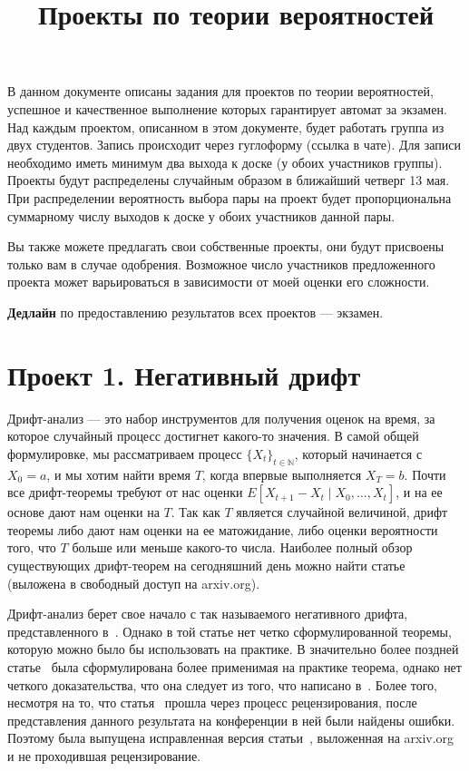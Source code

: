 \documentclass[12pt]{article}
\title{Проекты по теории вероятностей}
\newcommand\N{\mathbb{N}}
\begin{document}
\maketitle

В данном документе описаны задания для проектов по теории вероятностей, успешное и качественное выполнение которых гарантирует автомат за экзамен. Над каждым проектом, описанном в этом документе, будет работать группа из двух студентов. Запись происходит через гуглоформу (ссылка в чате). Для записи необходимо иметь минимум два выхода к доске (у обоих участников группы). Проекты будут распределены случайным образом в ближайший четверг 13 мая. При распределении вероятность выбора пары на проект будет пропорциональна суммарному числу выходов к доске у обоих участников данной пары.

Вы также можете предлагать свои собственные проекты, они будут присвоены только вам в случае одобрения. Возможное число участников предложенного проекта может варьироваться в зависимости от моей оценки его сложности.

\textbf{Дедлайн} по предоставлению результатов всех проектов --- экзамен.

\section*{Проект 1. Негативный дрифт}

Дрифт-анализ --- это набор инструментов для получения оценок на время, за которое случайный процесс достигнет какого-то значения. В самой общей формулировке, мы рассматриваем процесс $\{X_t\}_{t \in \N}$, который начинается с $X_0 = a$, и мы хотим найти время $T$, когда впервые выполняется $X_T = b$. Почти все дрифт-теоремы требуют от нас оценки $E[X_{t + 1} - X_{t} \mid X_0, \dots, X_t]$, и на ее основе дают нам оценки на $T$. Так как $T$ является случайной величиной, дрифт теоремы либо дают нам оценки на ее матожидание, либо оценки вероятности того, что $T$ больше или меньше какого-то числа. Наиболее полный обзор существующих дрифт-теорем на сегодняшний день можно найти статье~\cite{Lengler17} (выложена в свободный доступ на arxiv.org).

Дрифт-анализ берет свое начало с так называемого негативного дрифта, представленного в~\cite{Hajek82}. Однако в той статье нет четко сформулированной теоремы, которую можно было бы использовать на практике. В значительно более поздней статье~\cite{OlivetoW11} была сформулирована более применимая на практике теорема, однако нет четкого доказательства, что она следует из того, что написано в~\cite{Hajek82}. Более того, несмотря на то, что статья~\cite{OlivetoW11} прошла через процесс рецензирования, после представления данного результата на конференции в ней были найдены ошибки. Поэтому была выпущена исправленная версия статьи~\cite{OlivetoW12}, выложенная на arxiv.org и не проходившая рецензирование.
\end{document}
